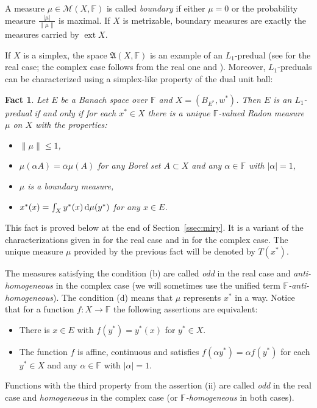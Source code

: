 \documentclass{amsart}
\numberwithin{equation}{section}
\newtheorem{fact}[thm]{Fact}
\theoremstyle{definition}
\def\fra{\mathfrak{A}}
\def\M{\mathcal M}
\def\ef{\mathbb F}
\def\ov{\overline}
\def \ext {\operatorname{ext}}
\def\di{\,\mbox{\rm d}}
\begin{document}
A measure $\mu\in \M(X,\ef)$ is called \emph{boundary} if either $\mu=0$ or the probability measure $\frac{|\mu|}{\|\mu\|}$ is maximal. If $X$ is metrizable, boundary measures are exactly the measures carried by $\ext X$.

If $X$ is a simplex, the space $\fra(X,\ef)$ is an example of an $L_1$-predual (see \cite[Proposition~3.23]{fonf} for the real case; the complex case follows from the real one and \cite[\S23, Theorem 6]{lacey}). Moreover, $L_1$-preduals can be characterized using a simplex-like property of the dual unit ball:

\begin{fact}\label{fact:L1}
Let $E$ be a Banach space over $\ef$ and $X=(B_{E ^*},w^*)$. Then $E$ is an $L_1$-predual if and only if for each $x^*\in X$ there is a unique $\ef$-valued Radon measure $\mu$ on $X$ with the properties:
 \begin{itemize}
	\item[(a)] $\|\mu\|\le1$,
	\item[(b)] $\mu(\alpha A)=\ov{\alpha} \mu(A)$ for any Borel set $A\subset X$ and any $\alpha\in\ef$ with $|\alpha|=1$,
	\item[(c)] $\mu$ is a boundary measure,
	\item[(d)] $x^*(x)=\int_X y^*(x)\di\mu(y^*)$ for any $x\in E$.
\end{itemize}
\end{fact}

This fact is proved below at the end of Section~\ref{ssec:miry}. It is a variant of the characterizations given
in \cite{lazar} for the real case and in \cite{effros} for the complex case.
The unique measure $\mu$ provided by the previous fact will be denoted by $T(x^*)$.

The measures satisfying the condition (b) are called \emph{odd} in the real case and \emph{anti-homogeneous} in the complex case (we will sometimes use the unified term \emph{$\ef$-anti-homogeneous}).
The condition (d) means that $\mu$ represents $x^*$ in a way. Notice that for a function $f:X\to\ef$ the following assertions are equivalent:
\begin{itemize}
	\item[(i)] There is $x\in E$ with $f(y^*)=y^*(x)$ for $y^*\in X$.
	\item[(ii)] The function $f$ is affine, continuous and satisfies $f(\alpha y^*)=\alpha f(y^*)$ for each $y^*\in X$ and any $\alpha\in\ef$ with $|\alpha|=1$.
	\end{itemize}
Functions with the third property from the assertion (ii) are called  \emph{odd} in the real case and \emph{homogeneous} in the complex case (or \emph{$\ef$-homogeneous} in both cases).
\end{document}
